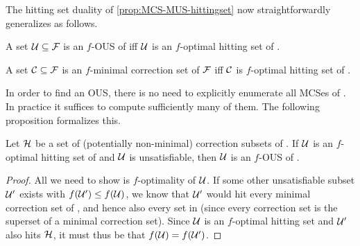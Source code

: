 The hitting set duality of \cref{prop:MCS-MUS-hittingset} now straightforwardly generalizes as follows. 

\begin{proposition}\label{prop:optimal-hitting-set}
  A set $\mathcal{U} \subseteq \mathcal{F} $ is an $f$-OUS of \formula iff $\mathcal{U}$ is an $f$-optimal hitting set of \mcses{\formula}.
  
  \noindent
   A set  $\mathcal{C} \subseteq \mathcal{F} $ is an $f$-minimal correction set of $ \mathcal{F} $ iff  $\mathcal{C}$ is $f$-optimal hitting set of .
\end{proposition}

In order to find an OUS, there is no need to explicitly enumerate all MCSes of \formula. In practice it suffices to compute sufficiently many of them. 
The following proposition formalizes this. 
% 

\begin{proposition}\label{prop:K}
  Let $\mathcal{H}$ be a set of (potentially non-minimal) correction subsets of \formula. 
  If $\mathcal{U}$ is an $f$-optimal hitting set of  and $\mathcal{U}$ is unsatisfiable, then $\mathcal{U}$ is an $f$-OUS of \formula. 
\end{proposition}
\begin{proof}
  All we need to show is $f$-optimality of $\mathcal{U}$.
  If some other unsatisfiable subset $\mathcal{U}'$ exists with $f(\mathcal{U}')\leq f(\mathcal{U})$, we know that $\mathcal{U}'$ would hit every minimal correction set of , and hence also every set in  (since every correction set is the superset of a minimal correction set).
  Since $\mathcal{U}$ is an $f$-optimal hitting set and $\mathcal{U}'$ also hits $\mathcal{H}$, it must thus be that $f(\mathcal{U})=f(\mathcal{U'})$. 
%   
\end{proof}




